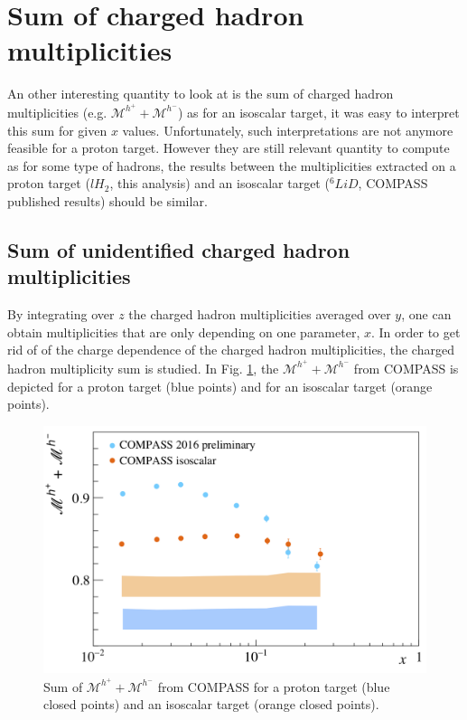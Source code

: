 \section{Sum of charged hadron multiplicities}

An other interesting quantity to look at is the sum of charged hadron multiplicities (e.g. $\mathscr{M}^{h^+}+\mathscr{M}^{h^-}$) as for an isoscalar target, it was easy to interpret this sum for given $x$ values. Unfortunately, such interpretations are not anymore feasible for a proton target. However they are still relevant quantity to compute as for some type of hadrons, the results between the multiplicities extracted on a proton target ($lH_2$, this analysis) and an isoscalar target ($^6LiD$, COMPASS published results) should be similar.

\subsection{Sum of unidentified charged hadron multiplicities}

By integrating over $z$ the charged hadron multiplicities averaged over $y$, one can obtain multiplicities that are only depending on one parameter, $x$. In order to get rid of of the charge dependence of the charged hadron multiplicities, the charged hadron multiplicity sum is studied. In Fig. \ref{pic:hsum}, the $\mathscr{M}^{h^+}+\mathscr{M}^{h^-}$ from COMPASS is depicted for a proton target (blue points) and for an isoscalar target (orange points).

\begin{figure}[!h]
  \centering
	\includegraphics[scale=0.5]{./gfx/hs.png}
	\caption{Sum of $\mathscr{M}^{h^+}+\mathscr{M}^{h^-}$ from COMPASS for a proton target (blue closed points) and an isoscalar target (orange closed points).}
	\label{pic:hsum}
\end{figure}

